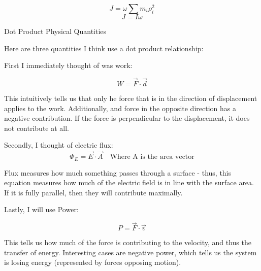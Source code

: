 \documentclass[12pt,letterpaper, onecolumn]{exam}
\begin{document}
\begin{questions}
\begin{solution}
        \begin{equation}
            J = \omega \sum  m_i\rho_i^2
        \end{equation}
        \begin{equation}
            J = I\omega 
        \end{equation}
    
    \end{solution}

    \question[]Dot Product Physical Quantities
    \begin{solution}
        Here are three quantities I think use a dot product relationship:


        First I immediately thought of was work:

        \begin{equation}
            W=\vec{F}\cdot\vec{d}
        \end{equation}

        This intuitively tells us that only he force that is in the direction of displacement applies to the work. Additionally, and force in the opposite direction has a negative contribution. If the force is perpendicular to the displacement, it does not contribute at all.

        Secondly, I thought of electric flux:
        \begin{equation}
            \Phi_E=\vec{E}\cdot\vec{A}\quad \text{Where A is the area vector}
        \end{equation}

        Flux measures how much something passes through a surface - thus, this equation measures how much of the electric field is in line with the surface area. If it is fully parallel, then they will contribute maximally.


        Lastly, I will use Power:

        \begin{equation}
            P=\vec{F}\cdot\vec{v}
        \end{equation}

        This tells us how much of the force is contributing to the velocity, and thus the transfer of energy. Interesting cases are negative power, which tells us the system is losing energy (represented by forces opposing motion).
    \end{solution}
\end{questions}
\end{document}
